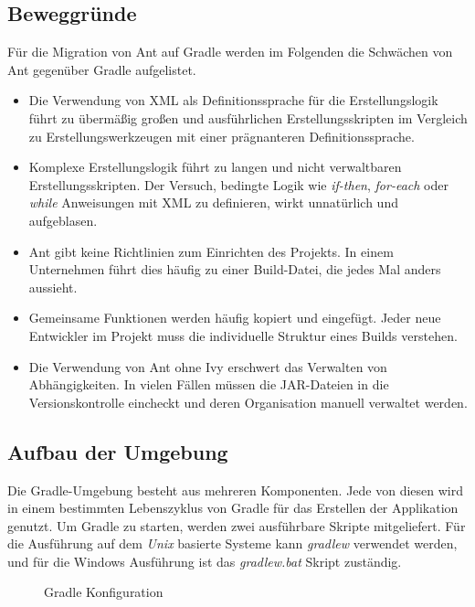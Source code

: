 \subsection{Beweggründe}
Für die Migration von Ant auf Gradle werden im Folgenden die Schwächen von Ant gegenüber Gradle aufgelistet.
\begin{itemize}
  \item Die Verwendung von XML als Definitionssprache für die Erstellungslogik führt zu übermäßig großen und ausführlichen Erstellungsskripten im Vergleich zu Erstellungswerkzeugen mit einer prägnanteren Definitionssprache. \cite{muschko2014gradle}
  \item Komplexe Erstellungslogik führt zu langen und nicht verwaltbaren Erstellungsskripten. Der Versuch, bedingte Logik wie \textit{if-then}, \textit{for-each} oder \textit{while} Anweisungen mit XML zu definieren, wirkt unnatürlich und aufgeblasen.\cite{muschko2014gradle}
  \item Ant gibt keine Richtlinien zum Einrichten des Projekts. In einem Unternehmen führt dies häufig zu einer Build-Datei, die jedes Mal anders aussieht.\cite{berglund2011building}
  \item Gemeinsame Funktionen werden häufig kopiert und eingefügt. Jeder neue Entwickler im Projekt muss die individuelle Struktur eines Builds verstehen.\cite{varanasi2015introducing}
  \item Die Verwendung von Ant ohne Ivy erschwert das Verwalten von Abhängigkeiten. In vielen Fällen müssen die JAR-Dateien in die Versionskontrolle eincheckt und deren Organisation manuell verwaltet werden.\cite{varanasi2015introducing}
\end{itemize}

\subsection{Aufbau der Umgebung}
  Die Gradle-Umgebung besteht aus mehreren Komponenten. Jede von diesen wird in einem bestimmten Lebenszyklus von Gradle für das Erstellen der Applikation genutzt.\newline
  Um Gradle zu starten, werden zwei ausführbare Skripte mitgeliefert. Für die Ausführung auf dem \textit{Unix} basierte Systeme kann \textit{gradlew} verwendet werden, und für die Windows Ausführung ist das \textit{gradlew.bat} Skript zuständig.\bigbreak
  \begin{figure}[h!]
    \centering
    \begin{minipage}{7cm}
    \end{minipage}
    \caption{Gradle Konfiguration \cite{gradleStructure}}
    \label{fig:gradle_project_structure}
  \end{figure}

